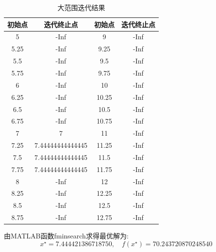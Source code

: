 \begin{table}[htbp]
  \centering
  \caption{大范围迭代结果}
    \begin{tabular}{|c|c|c|c|}
    \hline
    初始点   & 迭代终止点 & 初始点   & 迭代终止点 \\
    \hline
    5     & -Inf  & 9     & -Inf \\
    \hline
    5.25  & -Inf  & 9.25  & -Inf \\
    \hline
    5.5   & -Inf  & 9.5   & -Inf \\
    \hline
    5.75  & -Inf  & 9.75  & -Inf \\
    \hline
    6     & -Inf  & 10    & -Inf \\
    \hline
    6.25  & -Inf  & 10.25 & -Inf \\
    \hline
    6.5   & -Inf  & 10.5  & -Inf \\
    \hline
    6.75  & -Inf  & 10.75 & -Inf \\
    \hline
    7     & 7     & 11    & -Inf \\
    \hline
    7.25  & 7.44444444444445 & 11.25 & -Inf \\
    \hline
    7.5   & 7.44444444444445 & 11.5  & -Inf \\
    \hline
    7.75  & 7.44444444444445 & 11.75 & -Inf \\
    \hline
    8     & -Inf  & 12    & -Inf \\
    \hline
    8.25  & -Inf  & 12.25 & -Inf \\
    \hline
    8.5   & -Inf  & 12.5  & -Inf \\
    \hline
    8.75  & -Inf  & 12.75 & -Inf \\
    \hline
    \end{tabular}%
  \label{tab:addlabel}%
\end{table}%


由MATLAB函数fminsearch求得最优解为:\[x^{\star}=7.444421386718750,\quad f(x^{\star})=70.243720870248540\]


